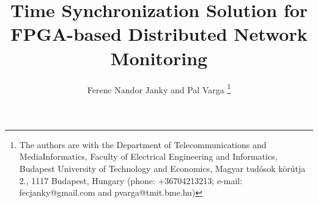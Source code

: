 \documentclass[journal]{IEEEtran}
\begin{document}
\title{Time Synchronization Solution for FPGA-based Distributed Network Monitoring}

\author{Ferenc Nandor Janky and Pal Varga \thanks{The authors are with the Department of Telecommunications and
 \mbox{MediaInformatics}, Faculty of Electrical Engineering and Informatics,
Budapest University of Technology and Economics,
Magyar tudósok körútja 2., 1117 Budapest, Hungary (phone: +36704213213; e-mail: \mbox{fecjanky@gmail.com} and pvarga@tmit.bme.hu)}}

%


\maketitle
\end{document}
